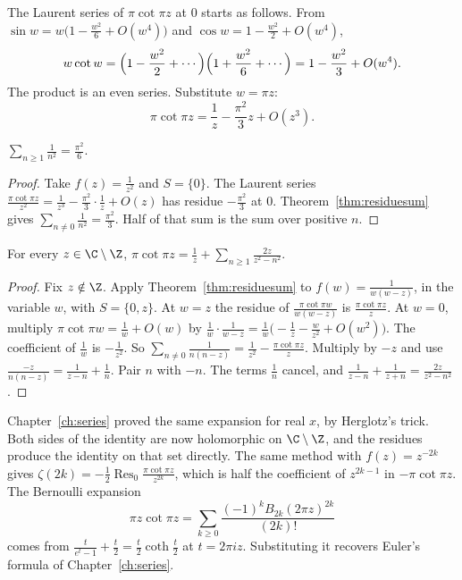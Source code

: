 The Laurent series of $\pi\cot\pi z$ at $0$ starts as follows. From $\sin w=w\bigl(1-\frac{w^2}6+O(w^4)\bigr)$ and $\cos w=1-\frac{w^2}2+O(w^4)$,
\[
w\cot w=\Bigl(1-\frac{w^2}2+\cdots\Bigr)\Bigl(1+\frac{w^2}6+\cdots\Bigr)=1-\frac{w^2}3+O(w^4).
\]
The product is an even series. Substitute $w=\pi z$:
\[
\pi\cot\pi z=\frac1z-\frac{\pi^2}3z+O(z^3).
\]

\begin{corollary}\label{cor:baselres}
$\displaystyle\sum_{n\ge1}\frac1{n^2}=\frac{\pi^2}6$.
\end{corollary}
\begin{proof}
Take $f(z)=\frac1{z^2}$ and $S=\{0\}$. The Laurent series $\frac{\pi\cot\pi z}{z^2}=\frac1{z^3}-\frac{\pi^2}3\cdot\frac1z+O(z)$ has residue $-\frac{\pi^2}3$ at $0$. Theorem~\ref{thm:residuesum} gives $\sum_{n\ne0}\frac1{n^2}=\frac{\pi^2}3$. Half of that sum is the sum over positive $n$.
\end{proof}

\begin{corollary}\label{cor:cotc}
For every $z\in\C\setminus\Z$, $\displaystyle\pi\cot\pi z=\frac1z+\sum_{n\ge1}\frac{2z}{z^2-n^2}$.
\end{corollary}
\begin{proof}
Fix $z\notin\Z$. Apply Theorem~\ref{thm:residuesum} to $f(w)=\frac1{w(w-z)}$, in the variable $w$, with $S=\{0,z\}$. At $w=z$ the residue of $\frac{\pi\cot\pi w}{w(w-z)}$ is $\frac{\pi\cot\pi z}z$. At $w=0$, multiply $\pi\cot\pi w=\frac1w+O(w)$ by $\frac1w\cdot\frac1{w-z}=\frac1w\bigl(-\frac1z-\frac w{z^2}+O(w^2)\bigr)$. The coefficient of $\frac1w$ is $-\frac1{z^2}$. So $\sum_{n\ne0}\frac1{n(n-z)}=\frac1{z^2}-\frac{\pi\cot\pi z}z$. Multiply by $-z$ and use $\frac{-z}{n(n-z)}=\frac1{z-n}+\frac1n$. Pair $n$ with $-n$. The terms $\frac1n$ cancel, and $\frac1{z-n}+\frac1{z+n}=\frac{2z}{z^2-n^2}$.
\end{proof}

Chapter~\ref{ch:series} proved the same expansion for real $x$, by Herglotz's trick. Both sides of the identity are now holomorphic on $\C\setminus\Z$, and the residues produce the identity on that set directly. The same method with $f(z)=z^{-2k}$ gives $\zeta(2k)=-\frac12\operatorname{Res}_0\frac{\pi\cot\pi z}{z^{2k}}$, which is half the coefficient of $z^{2k-1}$ in $-\pi\cot\pi z$. The Bernoulli expansion
\[
\pi z\cot\pi z=\sum_{k\ge0}\frac{(-1)^kB_{2k}(2\pi z)^{2k}}{(2k)!}
\]
comes from $\frac t{e^t-1}+\frac t2=\frac t2\coth\frac t2$ at $t=2\pi iz$. Substituting it recovers Euler's formula of Chapter~\ref{ch:series}.

